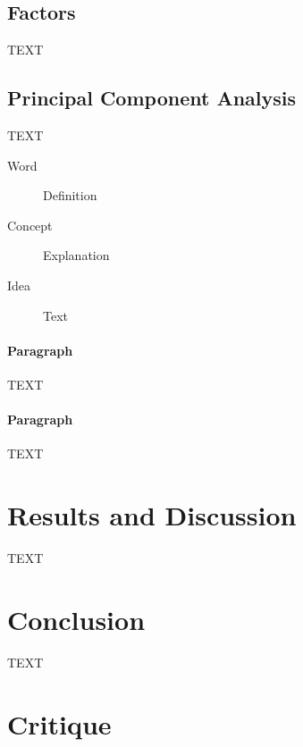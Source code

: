 \documentclass[fleqn,11pt]{SelfArx} %
\begin{document}
\subsection{Factors}

TEXT

\subsection{Principal Component Analysis}

TEXT

\begin{description}
\item[Word] Definition
\item[Concept] Explanation
\item[Idea] Text
\end{description}

\paragraph{Paragraph} TEXT 
\paragraph{Paragraph} TEXT







\section{Results and Discussion}

TEXT

\section{Conclusion}

TEXT

\section{Critique}
\end{document}
